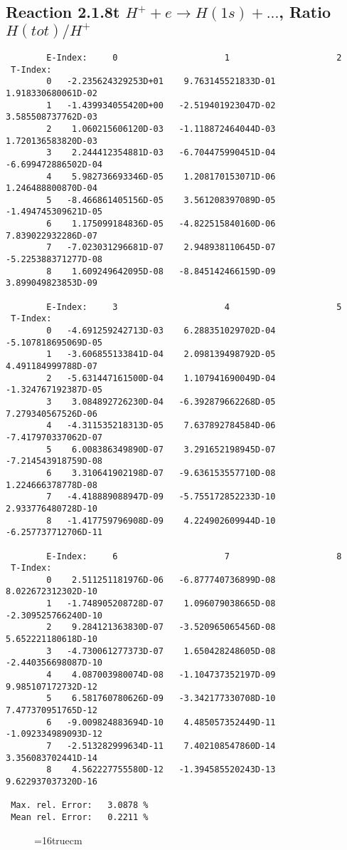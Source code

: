 \documentclass[12pt]{article}
\begin{document}
\subsection{
Reaction 2.1.8t  $H^+ + e \rightarrow H(1s) + ...$, Ratio $H(tot)/H^+$
}

\begin{small}\begin{verbatim}
        E-Index:     0                     1                     2
 T-Index:
        0   -2.235624329253D+01    9.763145521833D-01    1.918330680061D-02
        1   -1.439934055420D+00   -2.519401923047D-02    3.585508737762D-03
        2    1.060215606120D-03   -1.118872464044D-03    1.720136583820D-03
        3    2.244412354881D-03   -6.704475990451D-04   -6.699472886502D-04
        4    5.982736693346D-05    1.208170153071D-06    1.246488800870D-04
        5   -8.466861405156D-05    3.561208397089D-05   -1.494745309621D-05
        6    1.175099184836D-05   -4.822515840160D-06    7.839022932286D-07
        7   -7.023031296681D-07    2.948938110645D-07   -5.225388371277D-08
        8    1.609249642095D-08   -8.845142466159D-09    3.899049823853D-09

        E-Index:     3                     4                     5
 T-Index:
        0   -4.691259242713D-03    6.288351029702D-04   -5.107818695069D-05
        1   -3.606855133841D-04    2.098139498792D-05    4.491184999788D-07
        2   -5.631447161500D-04    1.107941690049D-04   -1.324767192387D-05
        3    3.084892726230D-04   -6.392879662268D-05    7.279340567526D-06
        4   -4.311535218313D-05    7.637892784584D-06   -7.417970337062D-07
        5    6.008386349890D-07    3.291652198945D-07   -7.214543918759D-08
        6    3.310641902198D-07   -9.636153557710D-08    1.224666378778D-08
        7   -4.418889088947D-09   -5.755172852233D-10    2.933776480728D-10
        8   -1.417759796908D-09    4.224902609944D-10   -6.257737712706D-11

        E-Index:     6                     7                     8
 T-Index:
        0    2.511251181976D-06   -6.877740736899D-08    8.022672312302D-10
        1   -1.748905208728D-07    1.096079038665D-08   -2.309525766240D-10
        2    9.284121363830D-07   -3.520965065456D-08    5.652221180618D-10
        3   -4.730061277373D-07    1.650428248605D-08   -2.440356698087D-10
        4    4.087003980074D-08   -1.104737352197D-09    9.985107172732D-12
        5    6.581760780626D-09   -3.342177330708D-10    7.477370951765D-12
        6   -9.009824883694D-10    4.485057352449D-11   -1.092334989093D-12
        7   -2.513282999634D-11    7.402108547860D-14    3.356083702441D-14
        8    4.562227755580D-12   -1.394585520243D-13    9.622937037320D-16

 Max. rel. Error:   3.0878 %
 Mean rel. Error:   0.2211 %

\end{verbatim}\end{small}
\begin{figure} \label{2.1.8rt}
\epsfxsize=16truecm
\end{figure}
\newpage
\end{document}
